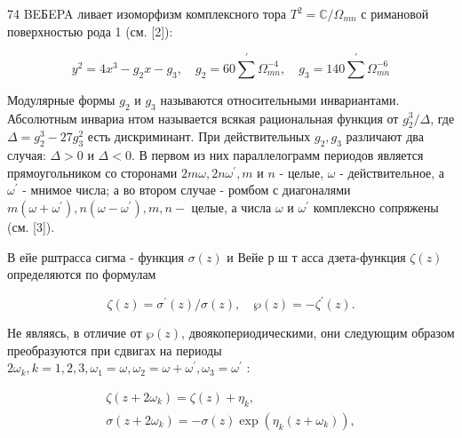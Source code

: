\documentclass[10pt]{article}
\begin{document}
74 BEБEPA ливает изоморфизм комплексного тора $T^{2}=\mathbb{C} / \Omega_{m n}$ с римановой поверхностью рода 1 (см. [2]):



\[

y^{2}=4 x^{3}-g_{2} x-g_{3}, \quad g_{2}=60 \sum^{\prime} \Omega_{m n}^{-4}, \quad g_{3}=140 \sum^{\prime} \Omega_{m n}^{-6}

\]



Модулярные формы $g_{2}$ и $g_{3}$ называются относительными инвариантами. Абсолютным инвариа нтом называется всякая рациональная функция от $g_{2}^{3} / \Delta$, где $\Delta=g_{2}^{3}-27 g_{3}^{2}$ есть дискриминант. При действительных $g_{2}, g_{3}$ различают два случая: $\Delta>0$ и $\Delta<0$. В первом из них параллелограмм периодов является прямоугольником со сторонами $2 m \omega, 2 n \omega^{\prime}, m$ и $n$ - целые, $\omega$ - действительное, а $\omega^{\prime}$ - мнимое числа; а во втором случае - ромбом с диагоналями $m\left(\omega+\omega^{\prime}\right), n\left(\omega-\omega^{\prime}\right), m, n-$ целые, а числа $\omega$ и $\omega^{\prime}$ комплексно сопряжены (см. [3]).



В ейе рштрасса сигма - функция $\sigma(z)$ и Вейе р ш т асса дзета-функция $\zeta(z)$ определяются по формулам



\[

\zeta(z)=\sigma^{\prime}(z) / \sigma(z), \quad \wp(z)=-\zeta^{\prime}(z) .

\]



Не являясь, в отличие от $\wp(z)$, двоякопериодическими, они следующим образом преобразуются при сдвигах на периоды $2 \omega_{k}, k=1,2,3, \omega_{1}=\omega, \omega_{2}=\omega+\omega^{\prime}, \omega_{3}=\omega^{\prime}$ :



\[

\begin{gathered}

\zeta\left(z+2 \omega_{k}\right)=\zeta(z)+\eta_{k}, \\

\sigma\left(z+2 \omega_{k}\right)=-\sigma(z) \exp \left(\eta_{k}\left(z+\omega_{k}\right)\right),

\end{gathered}

\]
\end{document}
